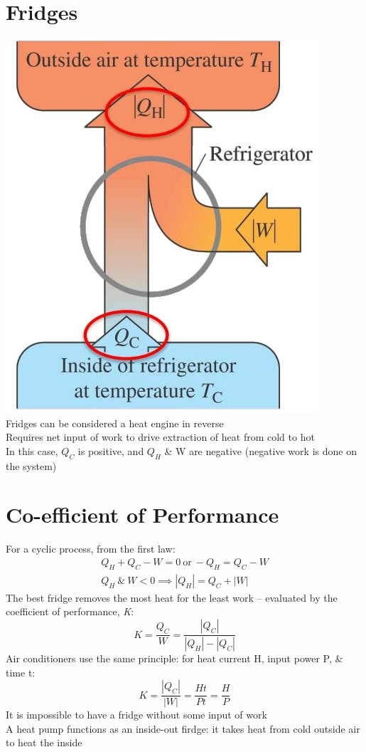 \documentclass[a4paper, 11pt, fleqn, normalem]{report}
\begin{document}
\section{Fridges}
\includegraphics[scale=0.7]{Fridge.jpg} \\
Fridges can be considered a heat engine in reverse \\
Requires net input of work to drive extraction of heat from cold to hot \\
In this case, $Q_{C}$ is positive, and $Q_{H}$ \& W are negative (negative work is done on the system)

\section{Co-efficient of Performance}
For a cyclic process, from the first law:
\begin{gather*}
	Q_{H} + Q_{C} - W = 0 ~\text{or}~ -Q_{H} = Q_{C} - W \\
	Q_{H} ~\&~ W < 0 \implies |Q_{H}| = Q_{C} + |W|
\end{gather*}
The best fridge removes the most heat for the least work -- evaluated by the coefficient of performance, \emph{K}:
\begin{equation*}
	K = \frac{Q_{C}}{W} = \frac{|Q_{C}|}{|Q_{H}| - |Q_{C}|}
\end{equation*}
Air conditioners use the same principle: for heat current H, input power P, \& time t:
\begin{equation*}
	K = \frac{|Q_{C}|}{|W|} = \frac{Ht}{Pt} = \frac{H}{P}
\end{equation*}
It is impossible to have a fridge without some input of work \\
A heat pump functions as an inside-out firdge: it takes heat from cold outside air to heat the inside
\end{document}
